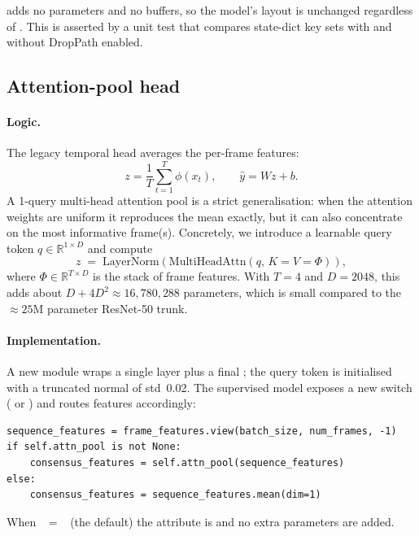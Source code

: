  adds no parameters and no buffers, so the model's
 layout is unchanged regardless of
. This is asserted by a unit test that
compares state-dict key sets with and without DropPath enabled.

\subsection{Attention-pool head}
\label{sec:phase2:attn}

\paragraph{Logic.} The legacy temporal head averages the per-frame
features:
\[
z = \frac{1}{T}\sum_{t=1}^{T} \phi(x_t), \qquad
\widehat{y} = W z + b.
\]
A 1-query multi-head attention pool is a strict generalisation: when the
attention weights are uniform it reproduces the mean exactly, but it can
also concentrate on the most informative frame(s). Concretely, we
introduce a learnable query token \(q \in \mathbb{R}^{1\times D}\) and
compute
\[
z \;=\; \mathrm{LayerNorm}\!\left(
        \mathrm{MultiHeadAttn}(q,\, K{=}V{=}\Phi)\right),
\]
where \(\Phi \in \mathbb{R}^{T\times D}\) is the stack of frame
features. With \(T=4\) and \(D=2048\), this adds about
\(D + 4D^2 \approx 16{,}780{,}288\) parameters, which is small compared
to the \(\approx 25\)M parameter ResNet-50 trunk.

\paragraph{Implementation.} A new  module wraps a
single  layer plus a final
; the query token is initialised with a truncated
normal of std~0.02. The supervised model exposes a new
 switch ( or ) and routes
features accordingly:

\begin{lstlisting}[style=py]
sequence_features = frame_features.view(batch_size, num_frames, -1)
if self.attn_pool is not None:
    consensus_features = self.attn_pool(sequence_features)
else:
    consensus_features = sequence_features.mean(dim=1)
\end{lstlisting}

When ~$=$~ (the default) the
 attribute is  and no extra parameters are
added.

